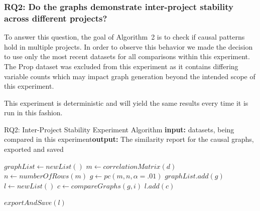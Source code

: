 \documentclass[]{svjour3}
\begin{document}
\subsubsection{RQ2: Do the graphs demonstrate inter-project stability across different projects?}
To answer this question, the goal of Algorithm~2 is to check if causal patterns hold in multiple projects. 
In order to observe this behavior we made the decision to use only the most recent datasets for all comparisons within this experiment.   The Prop dataset was excluded from this experiment as it contains differing variable counts which may impact graph generation beyond the intended scope of this experiment.



This experiment is deterministic and will yield the same results every time it is run in this fashion.
\begin{algorithm}[!h]
\footnotesize
    \caption{RQ2: Inter-Project Stability Experiment Algorithm \newline\textbf{input: }datasets,  being compared in this experiment\newline\textbf{output: }The similarity report for the causal graphs, exported and saved}
    \begin{algorithmic}[1]
        \State $graphList \leftarrow new List()$
            \State $m \leftarrow correlationMatrix(d)$
            \State $n \leftarrow numberOfRows(m)$
            \State $g \leftarrow pc(m, n, \alpha = .01)$
            \State $graphList.add(g)$
        \EndFor
            \State $l \leftarrow newList()$
                    \State $c \leftarrow compareGraphs(g, i)$
                    \State $l.add(c)$
                \EndIf
                
            \EndFor
            \State $exportAndSave(l)$
        \EndFor
    \end{algorithmic}
\end{algorithm}
\end{document}
